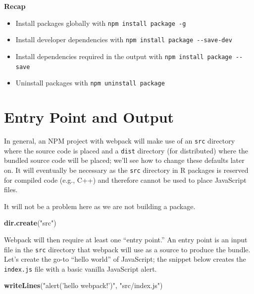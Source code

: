 \documentclass[10pt,]{krantz}
\makeatletter
\newenvironment{Shaded}{\begin{snugshade}}{\end{snugshade}}
\newcommand{\KeywordTok}[1]{\textcolor[rgb]{0.27,0.27,0.27}{\textbf{#1}}}
\newcommand{\NormalTok}[1]{#1}
\newcommand{\StringTok}[1]{\textcolor[rgb]{0.5,0.5,0.5}{#1}}
\providecommand{\tightlist}{%
  \setlength{\itemsep}{0pt}\setlength{\parskip}{0pt}}
\newenvironment{kframe}{%
\medskip{}
\setlength{\fboxsep}{.8em}
 \def\at@end@of@kframe{}%
 \ifinner\ifhmode%
  \def\at@end@of@kframe{\end{minipage}}%
  \begin{minipage}{\columnwidth}%
 \fi\fi%
 \def\FrameCommand##1{\hskip\@totalleftmargin \hskip-\fboxsep
 \colorbox{shadecolor}{##1}\hskip-\fboxsep
     \hskip-\linewidth \hskip-\@totalleftmargin \hskip\columnwidth}%
 \MakeFramed {\advance\hsize-\width
   \@totalleftmargin\z@ \linewidth\hsize
   \@setminipage}}%
 {\par\unskip\endMakeFramed%
 \at@end@of@kframe}
\renewenvironment{Shaded}{\begin{kframe}}{\end{kframe}}
\makeatother
\begin{document}
\textbf{Recap}

\begin{itemize}
\tightlist
\item
  Install packages globally with \texttt{npm\ install\ package\ -g}
\item
  Install developer dependencies with \texttt{npm\ install\ package\ -\/-save-dev}
\item
  Install dependencies required in the output with \texttt{npm\ install\ package\ -\/-save}
\item
  Uninstall packages with \texttt{npm\ uninstall\ package}
\end{itemize}

\hypertarget{webpack-intro-entry-points}{%
\section{Entry Point and Output}\label{webpack-intro-entry-points}}

In general, an NPM project with webpack will make use of an \texttt{src} directory where the source code is placed and a \texttt{dist} directory (for distributed) where the bundled source code will be placed; we'll see how to change these defaults later on. It will eventually be necessary as the \texttt{src} directory in R packages is reserved for compiled code (e.g., C++) and therefore cannot be used to place JavaScript files.

It will not be a problem here as we are not building a package.

\begin{Shaded}
\begin{Highlighting}[]
\KeywordTok{dir.create}\NormalTok{(}\StringTok{"src"}\NormalTok{)}
\end{Highlighting}
\end{Shaded}

Webpack will then require at least one ``entry point.'' An entry point is an input file in the \texttt{src} directory that webpack will use as a source to produce the bundle. Let's create the go-to ``hello world'' of JavaScript; the snippet below creates the \texttt{index.js} file with a basic vanilla JavaScript alert.

\begin{Shaded}
\begin{Highlighting}[]
\KeywordTok{writeLines}\NormalTok{(}\StringTok{"alert('hello webpack!')"}\NormalTok{, }\StringTok{"src/index.js"}\NormalTok{) }
\end{Highlighting}
\end{Shaded}
\end{document}
